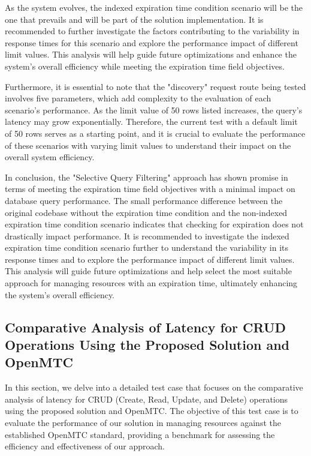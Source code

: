 \documentclass[a4paper,fleqn]{cas-dc}
\begin{document}
As the system evolves, the indexed expiration time condition scenario will be the one that prevails and will be part of the solution implementation. It is recommended to further investigate the factors contributing to the variability in response times for this scenario and explore the performance impact of different limit values. This analysis will help guide future optimizations and enhance the system's overall efficiency while meeting the expiration time field objectives.

Furthermore, it is essential to note that the "discovery" request route being tested involves five parameters, which add complexity to the evaluation of each scenario's performance. As the limit value of 50 rows listed increases, the query's latency may grow exponentially. Therefore, the current test with a default limit of 50 rows serves as a starting point, and it is crucial to evaluate the performance of these scenarios with varying limit values to understand their impact on the overall system efficiency.

In conclusion, the "Selective Query Filtering" approach has shown promise in terms of meeting the expiration time field objectives with a minimal impact on database query performance. The small performance difference between the original codebase without the expiration time condition and the non-indexed expiration time condition scenario indicates that checking for expiration does not drastically impact performance. It is recommended to investigate the indexed expiration time condition scenario further to understand the variability in its response times and to explore the performance impact of different limit values. This analysis will guide future optimizations and help select the most suitable approach for managing resources with an expiration time, ultimately enhancing the system's overall efficiency.

\subsection{Comparative Analysis of Latency for CRUD Operations Using the Proposed Solution and OpenMTC}

In this section, we delve into a detailed test case that focuses on the comparative analysis of latency for CRUD (Create, Read, Update, and Delete) operations using the proposed solution and OpenMTC. The objective of this test case is to evaluate the performance of our solution in managing resources against the established OpenMTC standard, providing a benchmark for assessing the efficiency and effectiveness of our approach.
\end{document}
